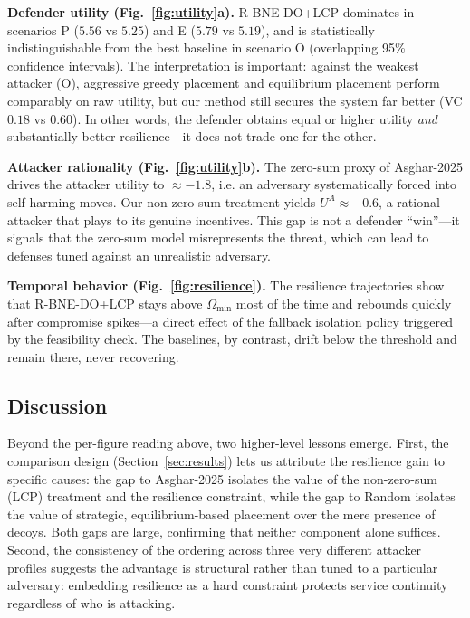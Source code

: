 \documentclass[conference]{IEEEtran}
\begin{document}
\textbf{Defender utility (Fig.~\ref{fig:utility}a).} R-BNE-DO+LCP dominates in
scenarios P ($5.56$ vs $5.25$) and E ($5.79$ vs $5.19$), and is statistically
indistinguishable from the best baseline in scenario O (overlapping 95\%
confidence intervals). The interpretation is important: against the weakest
attacker (O), aggressive greedy placement and equilibrium placement perform
comparably on raw utility, but our method still secures the system far better
(VC $0.18$ vs $0.60$). In other words, the defender obtains equal or higher
utility \emph{and} substantially better resilience---it does not trade one for
the other.

\textbf{Attacker rationality (Fig.~\ref{fig:utility}b).} The zero-sum proxy of
Asghar-2025 drives the attacker utility to $\approx-1.8$, i.e. an adversary
systematically forced into self-harming moves. Our non-zero-sum treatment yields
$U^A\approx-0.6$, a rational attacker that plays to its genuine incentives. This
gap is not a defender ``win''---it signals that the zero-sum model misrepresents
the threat, which can lead to defenses tuned against an unrealistic adversary.

\textbf{Temporal behavior (Fig.~\ref{fig:resilience}).} The resilience
trajectories show that R-BNE-DO+LCP stays above $\Omega_{\min}$ most of the
time and rebounds quickly after compromise spikes---a direct effect of the
fallback isolation policy triggered by the feasibility check. The baselines, by
contrast, drift below the threshold and remain there, never recovering.

\subsection{Discussion}

Beyond the per-figure reading above, two higher-level lessons emerge. First, the
comparison design (Section~\ref{sec:results}) lets us attribute the resilience
gain to specific causes: the gap to Asghar-2025 isolates the value of the
non-zero-sum (LCP) treatment and the resilience constraint, while the gap to
Random isolates the value of strategic, equilibrium-based placement over the
mere presence of decoys. Both gaps are large, confirming that neither component
alone suffices. Second, the consistency of the ordering across three very
different attacker profiles suggests the advantage is structural rather than
tuned to a particular adversary: embedding resilience as a hard constraint
protects service continuity regardless of who is attacking.
\end{document}
